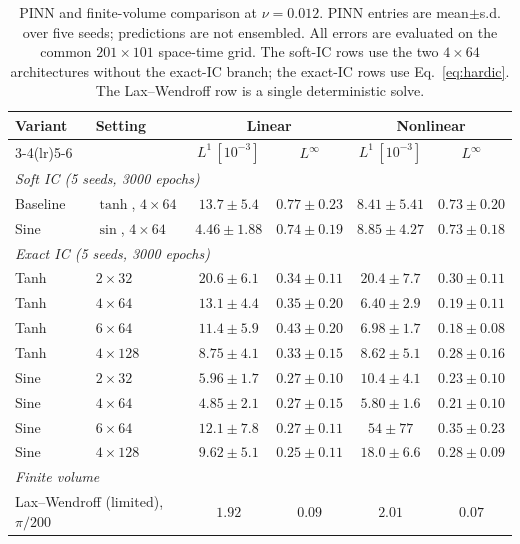\documentclass[11pt]{article}
\begin{document}
\begin{table}[t]
  \centering
  \small
  \setlength{\tabcolsep}{4pt}
  \begin{tabular}{llcccc}
    \toprule
    Variant & Setting & \multicolumn{2}{c}{Linear} & \multicolumn{2}{c}{Nonlinear}\\
    \cmidrule(lr){3-4}\cmidrule(lr){5-6}
    & & $L^1\,[10^{-3}]$ & $L^\infty$ & $L^1\,[10^{-3}]$ & $L^\infty$\\
    \midrule
    \multicolumn{6}{l}{\emph{Soft IC (5 seeds, 3000 epochs)}}\\
    Baseline & $\tanh$, $4\times64$          & $13.7{\pm}5.4$ & $0.77{\pm}0.23$ & $8.41{\pm}5.41$ & $0.73{\pm}0.20$\\
    Sine     & $\sin$, $4\times64$           & $4.46{\pm}1.88$ & $0.74{\pm}0.19$ & $8.85{\pm}4.27$ & $0.73{\pm}0.18$\\
    \midrule
    \multicolumn{6}{l}{\emph{Exact IC (5 seeds, 3000 epochs)}}\\
    Tanh     & $2\times32$                   & $20.6{\pm}6.1$ & $0.34{\pm}0.11$ & $20.4{\pm}7.7$ & $0.30{\pm}0.11$\\
    Tanh     & $4\times64$                   & $13.1{\pm}4.4$ & $0.35{\pm}0.20$ & $6.40{\pm}2.9$ & $0.19{\pm}0.11$\\
    Tanh     & $6\times64$                   & $11.4{\pm}5.9$ & $0.43{\pm}0.20$ & $6.98{\pm}1.7$ & $0.18{\pm}0.08$\\
    Tanh     & $4\times128$                  & $8.75{\pm}4.1$ & $0.33{\pm}0.15$ & $8.62{\pm}5.1$ & $0.28{\pm}0.16$\\
    Sine     & $2\times32$                   & $5.96{\pm}1.7$ & $0.27{\pm}0.10$ & $10.4{\pm}4.1$ & $0.23{\pm}0.10$\\
    Sine     & $4\times64$                   & $4.85{\pm}2.1$ & $0.27{\pm}0.15$ & $5.80{\pm}1.6$ & $0.21{\pm}0.10$\\
    Sine     & $6\times64$                   & $12.1{\pm}7.8$ & $0.27{\pm}0.11$ & $54{\pm}77$ & $0.35{\pm}0.23$\\
    Sine     & $4\times128$                  & $9.62{\pm}5.1$ & $0.25{\pm}0.11$ & $18.0{\pm}6.6$ & $0.28{\pm}0.09$\\
    \midrule
    \multicolumn{6}{l}{\emph{Finite volume}}\\
    \multicolumn{2}{l}{Lax--Wendroff (limited), $\pi/200$} & $1.92$ & $0.09$ & $2.01$ & $0.07$\\
    \bottomrule
  \end{tabular}
  \caption{PINN and finite-volume comparison at $\nu=0.012$. PINN entries are
    mean$\pm$s.d. over five seeds; predictions are not ensembled. All errors
    are evaluated on the common $201\times101$ space-time grid. The soft-IC
    rows use the two $4\times64$ architectures without the exact-IC branch;
    the exact-IC rows use Eq.~\eqref{eq:hardic}. The Lax--Wendroff row is a
  single deterministic solve.}
  \label{tab:arch}
\end{table}
\end{document}

